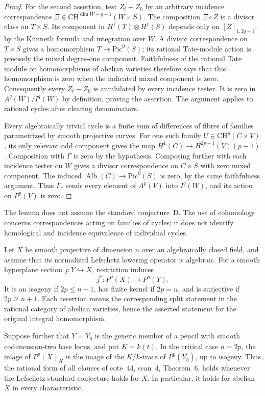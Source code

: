 \begin{proof}
For the second assertion, test $Z_t-Z_0$ by an arbitrary incidence
correspondence
$\Xi\in\mathrm{CH}^{\dim W-q+1}(W\times S)$.
The composition $\Xi\circ Z$ is a divisor class on $T\times S$.
Its component in $H^1(T)\otimes H^1(S)$ depends only on
$[Z]_{1,2q-1}$, by the K\"unneth formula and integration over $W$.
A divisor correspondence on $T\times S$ gives a homomorphism
$T\to\mathrm{Pic}^0(S)$; its rational Tate-module action is precisely
the mixed degree-one component.  Faithfulness of the rational Tate
module on homomorphisms of abelian varieties therefore says that this
homomorphism is zero when the indicated mixed component is zero.
Consequently every $Z_t-Z_0$ is annihilated by every incidence tester.
It is zero in $A^q(W)/I^q(W)$ by definition, proving the assertion.
The argument applies to rational cycles after clearing denominators.

Every algebraically trivial cycle is a finite sum of differences of
fibres of families parametrized by smooth projective curves.
For one such family
$U\in\mathrm{CH}^{p}(C\times V)$, its only relevant odd component
gives the map $H^1(C)\to H^{2p-1}(V)(p-1)$.
Composition with $\Gamma$ is zero by the hypothesis.  Composing further
with each incidence tester on $W$ gives a divisor correspondence on
$C\times S$ with zero mixed component.  The induced
$\operatorname{Alb}(C)\to\mathrm{Pic}^0(S)$ is zero, by the same
faithfulness argument.  Thus $\Gamma_*$ sends every element of
$A^p(V)$ into $I^q(W)$, and its action on $P^p(V)$ is zero.
\end{proof}

The lemma does not assume the standard conjecture~D.  The use of
cohomology concerns correspondences acting on families of cycles;
it does not identify homological and incidence equivalence of individual
cycles.

\begin{theorem}
\label{jac:P02}
Let $X$ be smooth projective of dimension $n$ over an algebraically
closed field, and assume that its normalized Lefschetz lowering
operator is algebraic.  For a smooth hyperplane section $j:Y\hookrightarrow X$,
restriction induces
\[
 j^*:P^p(X)\longrightarrow P^p(Y).
\]
It is an isogeny if $2p\le n-1$, has finite kernel if $2p=n$, and
is surjective if $2p\ge n+1$.  Each assertion means the corresponding
split statement in the rational category of abelian varieties, hence
the asserted statement for the original integral homomorphism.

Suppose further that $Y=Y_\eta$ is the generic member of a pencil with
smooth codimension-two base locus, and put $K=k(t)$.  In the critical
case $n=2p$, the image of $P^p(X)_K$ is the image of the $K/k$-trace
of $P^p(Y_\eta)$, up to isogeny.  Thus the rational form of all clauses
of cote~44, scan~4, Theorem~6, holds whenever the Lefschetz standard
conjecture holds for $X$.  In particular, it holds for abelian $X$
in every characteristic.
\end{theorem}

